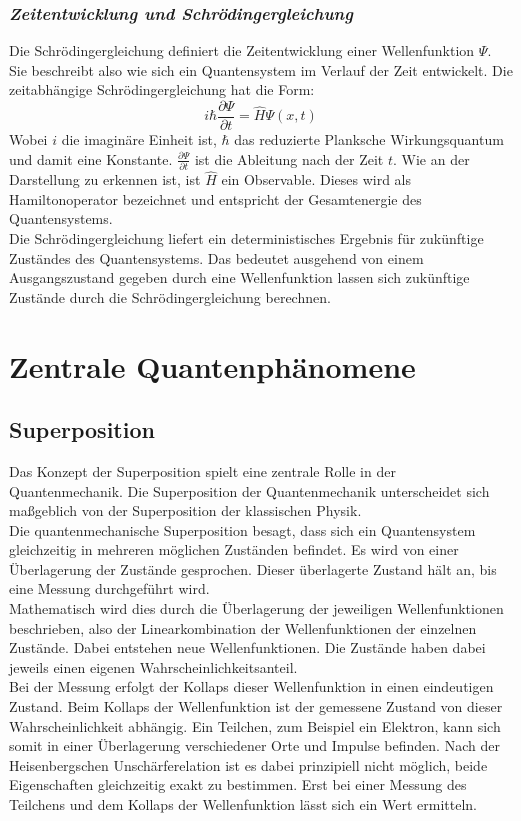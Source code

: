 \subsubsection*{\textit{Zeitentwicklung und Schrödingergleichung}}

Die Schrödingergleichung definiert die Zeitentwicklung einer Wellenfunktion $\Psi$. Sie beschreibt also wie sich ein Quantensystem im Verlauf der Zeit entwickelt. Die zeitabhängige Schrödingergleichung hat die Form:
\begin{equation*}
i\hbar \frac{\partial \Psi}{\partial t} = \hat{H} \Psi(x,t)
\end{equation*}
Wobei $i$ die imaginäre Einheit ist, $\hbar$ das reduzierte Planksche Wirkungsquantum und damit eine Konstante. $\frac{\partial \Psi}{\partial t}$ ist die Ableitung nach der Zeit $t$. Wie an der Darstellung zu erkennen ist, ist $\hat{H}$ ein Observable. Dieses wird als Hamiltonoperator bezeichnet und entspricht der Gesamtenergie des Quantensystems.\\
Die Schrödingergleichung liefert ein deterministisches Ergebnis für zukünftige Zuständes des Quantensystems. Das bedeutet ausgehend von einem Ausgangszustand gegeben durch eine Wellenfunktion lassen sich zukünftige Zustände durch die Schrödingergleichung berechnen.

\section{Zentrale Quantenphänomene }

\subsection{Superposition }

Das Konzept der Superposition spielt eine zentrale Rolle in der Quantenmechanik. Die Superposition der Quantenmechanik unterscheidet sich maßgeblich von der Superposition der klassischen Physik.\\
Die quantenmechanische Superposition besagt, dass sich ein Quantensystem gleichzeitig in mehreren möglichen Zuständen befindet. Es wird von einer Überlagerung der Zustände gesprochen. Dieser überlagerte Zustand hält an, bis eine Messung durchgeführt wird.\\
Mathematisch wird dies durch die Überlagerung der jeweiligen Wellenfunktionen beschrieben, also der Linearkombination der Wellenfunktionen der einzelnen Zustände. Dabei entstehen neue Wellenfunktionen. Die Zustände haben dabei jeweils einen eigenen Wahrscheinlichkeitsanteil.\\
Bei der Messung erfolgt der Kollaps dieser Wellenfunktion in einen eindeutigen Zustand. Beim Kollaps der Wellenfunktion ist der gemessene Zustand von dieser Wahrscheinlichkeit abhängig. Ein Teilchen, zum Beispiel ein Elektron, kann sich somit in einer Überlagerung verschiedener Orte und Impulse befinden. Nach der Heisenbergschen Unschärferelation ist es dabei prinzipiell nicht möglich, beide Eigenschaften gleichzeitig exakt zu bestimmen. Erst bei einer Messung des Teilchens und dem Kollaps der Wellenfunktion lässt sich ein Wert ermitteln.\\

